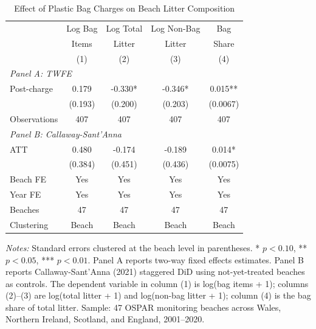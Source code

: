 \begin{table}[htbp]
\centering
\begin{threeparttable}
\caption{Effect of Plastic Bag Charges on Beach Litter Composition}
\label{tab:main}
\begin{tabular}{lcccc}
\toprule
 & Log Bag & Log Total & Log Non-Bag & Bag \\
 & Items & Litter & Litter & Share \\
 & (1) & (2) & (3) & (4) \\
\midrule
\multicolumn{5}{l}{\textit{Panel A: TWFE}} \\[3pt]
Post-charge & 0.179 & -0.330* & -0.346* & 0.015** \\
 & (0.193) & (0.200) & (0.203) & (0.0067) \\
Observations & 407 & 407 & 407 & 407 \\
\midrule
\multicolumn{5}{l}{\textit{Panel B: Callaway-Sant'Anna}} \\[3pt]
ATT & 0.480 & -0.174 & -0.189 & 0.014* \\
 & (0.384) & (0.451) & (0.436) & (0.0075) \\
\midrule
Beach FE & Yes & Yes & Yes & Yes \\
Year FE & Yes & Yes & Yes & Yes \\
Beaches & 47 & 47 & 47 & 47 \\
Clustering & Beach & Beach & Beach & Beach \\
\bottomrule
\end{tabular}
\begin{tablenotes}[flushleft]
\small
\item \textit{Notes:} Standard errors clustered at the beach level in parentheses. * $p<0.10$, ** $p<0.05$, *** $p<0.01$. Panel A reports two-way fixed effects estimates. Panel B reports Callaway-Sant'Anna (2021) staggered DiD using not-yet-treated beaches as controls. The dependent variable in column (1) is log(bag items + 1); columns (2)--(3) are log(total litter + 1) and log(non-bag litter + 1); column (4) is the bag share of total litter. Sample: 47 OSPAR monitoring beaches across Wales, Northern Ireland, Scotland, and England, 2001--2020.
\end{tablenotes}
\end{threeparttable}
\end{table}
